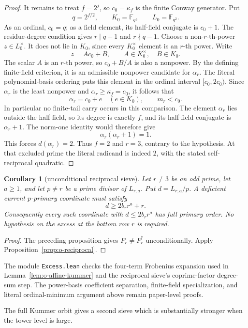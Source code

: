 \documentclass[11pt]{article}
\newtheorem{corollary}[theorem]{Corollary}
\theoremstyle{definition}
\theoremstyle{remark}
\begin{document}
\begin{proof}
It remains to treat $f=2^j$, so
$c_0=\kappa_f$ is the finite Conway generator.  Put
\[
 q=2^{f/2},\qquad K_0=\mathbb F_q,
 \qquad L_0=\mathbb F_{q^2}.
\]
As an ordinal, $c_0=q$; as a field element, its half-field conjugate is
$c_0+1$.  The residue-degree condition gives $r\mid q+1$ and
$r\nmid q-1$.  Choose a non-$r$-th-power $z\in L_0^\times$.
It does not lie in $K_0$, since every $K_0^\times$ element is an
$r$-th power.  Write
\[
 z=A c_0+B,\qquad A\in K_0^\times,\quad B\in K_0.
\]
The scalar $A$ is an $r$-th power, so $c_0+B/A$ is also a nonpower.
By the defining finite-field criterion, it is an admissible nonpower
candidate for $\alpha_r$.
The literal polynomial-basis ordering puts this element in the ordinal
interval $[c_0,2c_0)$.  Since $\alpha_r$ is the least nonpower and
$\alpha_r\geq\kappa_f=c_0$, it follows that
\[
 \alpha_r=c_0+e\quad(e\in K_0),\qquad m_r<c_0.
\]
In particular no finite-tail carry occurs in this comparison.  The
element $\alpha_r$ lies outside the half field, so its degree is exactly
$f$, and its half-field conjugate is $\alpha_r+1$.
The norm-one identity would therefore give
\[
 \alpha_r(\alpha_r+1)=1.
\]
This forces $d(\alpha_r)=2$.  Thus $f=2$ and $r=3$, contrary to the
hypothesis.  At that excluded prime the literal radicand is indeed $2$,
with the stated self-reciprocal quadratic.
\end{proof}

\begin{corollary}[unconditional reciprocal sieve]
\label{cor:o-minimal-reciprocal}
Let $r\ne3$ be an odd prime, let $a\geq1$, and let $p\ne r$ be a prime
divisor of $L_{r,a}$.  Put $d=L_{r,a}/p$.  A deficient current
$p$-primary coordinate must satisfy
\[
 d\geq2b_r r^a+r.
\]
Consequently every such coordinate with $d\leq2b_r r^a$ has full
primary order.  No hypothesis on the excess at the bottom row $r$ is
required.
\end{corollary}

\begin{proof}
The preceding proposition gives $P_r\ne P_r^*$ unconditionally.
Apply Proposition~\ref{prop:o-reciprocal}.
\end{proof}

The module \texttt{Excess.lean} checks the four-term Frobenius expansion
used in Lemma~\ref{lem:o-affine-kummer} and the reciprocal sieve's
coprime-factor degree-sum step.  The power-basis coefficient
separation, finite-field specialization, and literal ordinal-minimum
argument above remain paper-level proofs.

The full Kummer orbit gives a second sieve which is substantially stronger
when the tower level is large.
\end{document}
